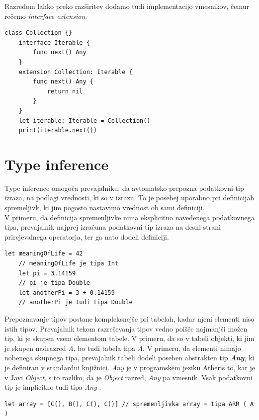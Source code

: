 \documentclass[a4paper, 12p]{book}
\begin{document}
Razredom lahko preko razširitev dodamo tudi implementacijo vmesnikov, čemur rečemo \textit{interface extension}.

\begin{lstlisting}[caption=Razširitev z vmesnikom, captionpos=b]
	class Collection {}
	interface Iterable {
	    func next() Any
	}
	extension Collection: Iterable {
	    func next() Any {
	        return nil
	    }
	}
	let iterable: Iterable = Collection()
	print(iterable.next())
\end{lstlisting}

\section{Type inference}

Type inference omogoča prevajalniku, da avtomatsko prepozna podatkovni tip izraza, na podlagi vrednosti, ki so v izrazu. To je posebej uporabno pri definicijah spremeljivk, ki jim pogosto nastavimo vrednost ob sami definiciji. \\
\indent V primeru, da definicija spremenljivke nima eksplicitno navedenega podatkovnega tipa, prevajalnik najprej izračuna podatkovni tip izraza na desni strani prirejevalnega operatorja, ter ga nato dodeli definiciji.

\begin{lstlisting}[caption={Avtomatično prepoznavanje podatkovnih tipov}, captionpos=b]
	let meaningOfLife = 42
	// meaningOfLife je tipa Int
	let pi = 3.14159
	// pi je tipa Double
	let anotherPi = 3 + 0.14159
	// anotherPi je tudi tipa Double
\end{lstlisting}

Prepoznavanje tipov postane kompleksnejše pri tabelah, kadar njeni elementi niso istih tipov. Prevajalnik tekom razreševanja tipov vedno poišče najmanjši možen tip, ki je skupen vsem elementom tabele. V primeru, da so v tabeli objekti, ki jim je skupen nadrazred \textit{A}, bo tudi tabela tipa \textit{A}. V primeru, da elementi nimajo nobenega skupnega tipa, prevajalnik tabeli dodeli poseben abstrakten tip \textit{\textbf{Any}}, ki je definiran v standardni knjižnici. \textit{Any} je v programskem jeziku Atheris to, kar je v Javi \textit{Object}, s to razliko, da je \textit{Object} razred, \textit{Any} pa vmesnik. Vsak podatkovni tip je implicitno tudi tipa \textit{Any} .

\begin{lstlisting}[caption={Elementi tabele s skupnim nadrazredom}, captionpos=b]
	let array = [C(), B(), C(), C()] // spremenljivka array = tipa ARR ( A )
\end{lstlisting}
\end{document}
